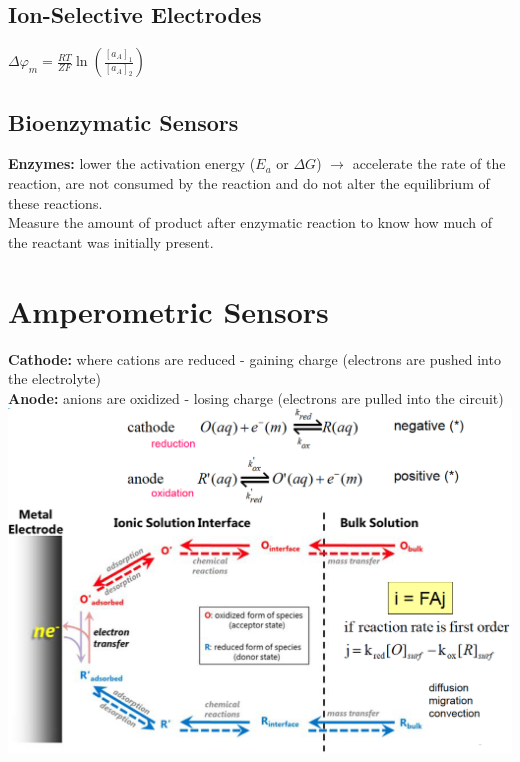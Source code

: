 \documentclass[9pt]{article}
\begin{document}
\begin{multicols}{2}
 \subsection{Ion-Selective Electrodes}
 $\Delta \varphi _m = \frac{RT}{ZF} \ln (\frac{[a_A]_1}{[a_A]_2})$
 \subsection{Bioenzymatic Sensors}
 \textbf{Enzymes: }lower the activation energy ($E_a$ or $\Delta G$) $\rightarrow$ accelerate the rate of the reaction, are not consumed by the reaction and do not alter the equilibrium of these reactions.\\
Measure the amount of product after enzymatic reaction to know how much of the reactant was initially present.
\section{Amperometric Sensors}
\textbf{Cathode: }where cations are reduced - gaining charge (electrons are pushed into the electrolyte)\\
\textbf{Anode: }anions are oxidized - losing charge (electrons are pulled into the circuit)\\
\includegraphics[scale=0.2]{Images/redox_current.png}

\end{multicols}
\end{document}
